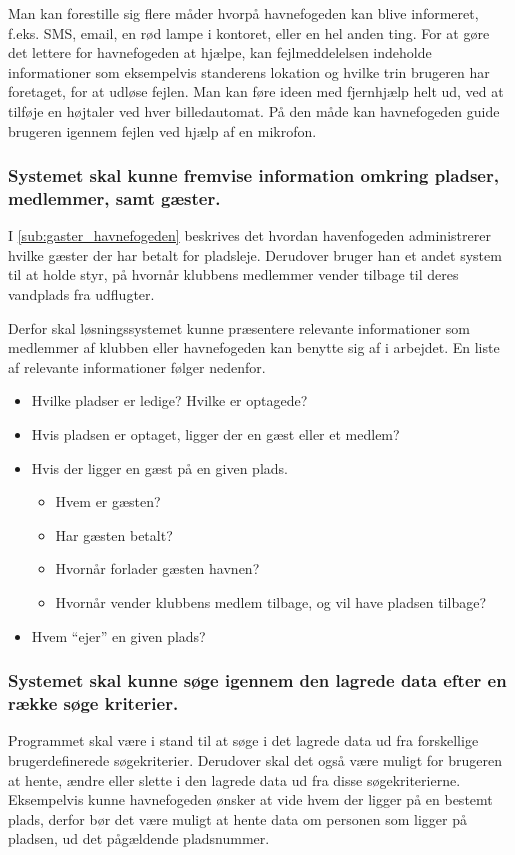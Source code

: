   Man kan forestille sig flere måder hvorpå havnefogeden kan blive informeret, f.eks. SMS, email, en rød lampe i kontoret, eller en hel anden ting. For at gøre det lettere for havnefogeden at hjælpe, kan fejlmeddelelsen indeholde informationer som eksempelvis standerens lokation og hvilke trin brugeren har foretaget, for at udløse fejlen. Man kan føre ideen med fjernhjælp helt ud, ved at tilføje en højtaler ved hver billedautomat. På den måde kan havnefogeden guide brugeren igennem fejlen ved hjælp af en mikrofon.

  \subsubsection{Systemet skal kunne fremvise information omkring pladser, medlemmer, samt gæster.}
  I \cref{sub:gaster_havnefogeden} beskrives det hvordan havenfogeden administrerer hvilke gæster der har betalt for pladsleje. Derudover bruger han et andet system til at holde styr, på hvornår klubbens medlemmer vender tilbage til deres vandplads fra udflugter.

  Derfor skal løsningssystemet kunne præsentere relevante informationer som medlemmer af klubben eller havnefogeden kan benytte sig af i arbejdet. En liste af relevante informationer følger nedenfor.

  \begin{itemize}
  \item Hvilke pladser er ledige? Hvilke er optagede?
  \item Hvis pladsen er optaget, ligger der en gæst eller et medlem?
  \item Hvis der ligger en gæst på en given plads.
    \begin{itemize}
      \item Hvem er gæsten?
      \item Har gæsten betalt?
      \item Hvornår forlader gæsten havnen?
      \item Hvornår vender klubbens medlem tilbage, og vil have pladsen tilbage?
    \end{itemize}
  \item Hvem \enquote{ejer} en given plads?
  \end{itemize}

  \subsubsection{Systemet skal kunne søge igennem den lagrede data efter en række søge kriterier.}
  Programmet skal være i stand til at søge i det lagrede data ud fra forskellige brugerdefinerede søgekriterier. Derudover skal det også være muligt for brugeren at hente, ændre eller slette i den lagrede data ud fra disse søgekriterierne. Eksempelvis kunne havnefogeden ønsker at vide hvem der ligger på en bestemt plads, derfor bør det være muligt at hente data om personen som ligger på pladsen, ud det pågældende pladsnummer.


